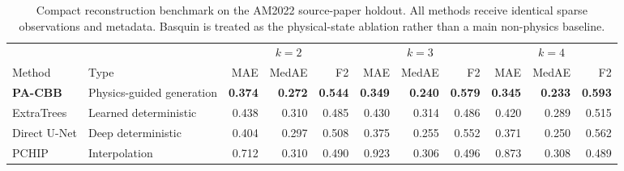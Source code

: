 \begin{table}[t]
\caption{Compact reconstruction benchmark on the AM2022 source-paper holdout. All methods receive identical sparse observations and metadata. Basquin is treated as the physical-state ablation rather than a main non-physics baseline.}
\label{tab:compact_reconstruction}
\centering\scriptsize\setlength{\tabcolsep}{5pt}
\begin{tabular}{llrrrrrrrrr}
\toprule
& & \multicolumn{3}{c}{$k=2$} & \multicolumn{3}{c}{$k=3$} & \multicolumn{3}{c}{$k=4$} \\
\cmidrule(lr){3-5}\cmidrule(lr){6-8}\cmidrule(lr){9-11}
Method & Type & MAE & MedAE & F2 & MAE & MedAE & F2 & MAE & MedAE & F2 \\
\midrule
\textbf{PA-CBB} & Physics-guided generation & \textbf{0.374} & \textbf{0.272} & \textbf{0.544} & \textbf{0.349} & \textbf{0.240} & \textbf{0.579} & \textbf{0.345} & \textbf{0.233} & \textbf{0.593} \\
ExtraTrees & Learned deterministic & 0.438 & 0.310 & 0.485 & 0.430 & 0.314 & 0.486 & 0.420 & 0.289 & 0.515 \\
Direct U-Net & Deep deterministic & 0.404 & 0.297 & 0.508 & 0.375 & 0.255 & 0.552 & 0.371 & 0.250 & 0.562 \\
PCHIP & Interpolation & 0.712 & 0.310 & 0.490 & 0.923 & 0.306 & 0.496 & 0.873 & 0.308 & 0.489 \\
\bottomrule
\end{tabular}
\end{table}
